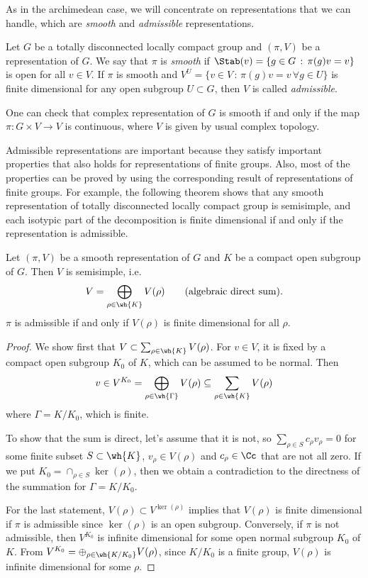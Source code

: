 As in the archimedean case, we will concentrate on representations that  we can handle, which are \emph{smooth} and \emph{admissible} representations. 
\begin{definition}
Let $G$ be a totally disconnected locally compact group and $(\pi, V)$ be a representation of $G$. We say that $\pi$ is \emph{smooth} if $\Stab(v) = \{g\in G\,:\,\pi(g)v= v\}$ is open for all $v\in V$. 
If $\pi$ is smooth and $V^{U} = \{v\in V\,:\, \pi(g)v= v\,\forall g\in U\}$ is finite dimensional for any open subgroup $U\subset G$, then $V$ is called \emph{admissible}.
\end{definition} 
 One can check that complex representation of $G$ is smooth if and only if the map $\pi:G\times V\to V$ is continuous, where $V$ is given by usual complex topology. 


Admissible representations are important because they satisfy important properties that also holds for representations of finite groups. Also, most of the properties can be proved by using the corresponding result of representations of finite groups. 
For example, the following theorem shows that any smooth representation of totally disconnected locally compact group is semisimple, and each isotypic part of the decomposition is finite dimensional if and only if the representation is admissible. 
\begin{proposition}
Let $(\pi, V)$ be a smooth representation of $G$ and $K$ be a compact open subgroup of $G$. Then $V$ is semisimple, i.e.
$$
V = \bigoplus_{\rho\in \wh{K}} V(\rho)\qquad(\text{algebraic direct sum}).
$$
$\pi$ is admissible if and only if $V(\rho)$ is finite dimensional for all $\rho$. 
\end{proposition}
\begin{proof}
We show first that $V\subset \sum_{\rho\in \wh{K}} V(\rho)$. 
For $v\in V$, it is fixed by a compact open subgroup $K_{0}$ of $K$, which can be assumed to be normal. Then 
$$
v\in V^{K_{0}} = \bigoplus_{\rho\in \wh{\Gamma}} V(\rho) \subseteq \sum_{\rho\in \wh{K}} V(\rho)
$$
where $\Gamma = K/K_{0}$, which is finite. 

To show that the sum is direct, let's assume that it is not, so $\sum_{\rho\in S} c_{\rho}v_{\rho} = 0$ for some finite subset $S\subset \wh{K}$, $v_{\rho}\in V(\rho)$ and $c_{\rho}\in \Cc$ that are not all zero. If we put $K_{0} = \cap_{\rho\in S}\ker (\rho)$, then we obtain a contradiction to the directness of the summation for $\Gamma = K/K_{0}$. 

For the last statement, $V(\rho)\subset V^{\ker(\rho)}$ implies that $V(\rho)$ is finite dimensional if $\pi$ is admissible since $\ker(\rho)$ is an open subgroup. 
Conversely, if $\pi$ is not admissible, then $V^{K_{0}}$ is infinite dimensional for some open normal subgroup $K_{0}$ of $K$. From $V^{K_{0}} = \oplus_{\rho\in \wh{K/K_{0}}} V(\rho)$, since $K/K_{0}$ is a finite group, $V(\rho)$ is infinite dimensional for some $\rho$. 
\end{proof}


